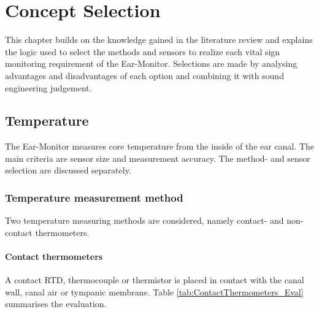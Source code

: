 \chapter{Concept Selection}
\label{chp:Concept Selection}
This chapter builds on the knowledge gained in the literature review and explains the logic used to select the methods and sensors to realize each vital sign monitoring requirement of the Ear-Monitor. Selections are made by analysing advantages and disadvantages of each option and combining it with sound engineering judgement.

\section{Temperature}
The Ear-Monitor measures core temperature from the inside of the ear canal. The main criteria are sensor size and measurement accuracy. The method- and sensor selection are discussed separately.

\subsection{Temperature measurement method}
Two temperature measuring methods are considered, namely contact- and non-contact thermometers.

\subsubsection{Contact thermometers}
A contact RTD, thermocouple or thermistor is placed in contact with the canal wall, canal air or tympanic membrane. Table \ref{tab:ContactThermometers_Eval} summarises the evaluation.

